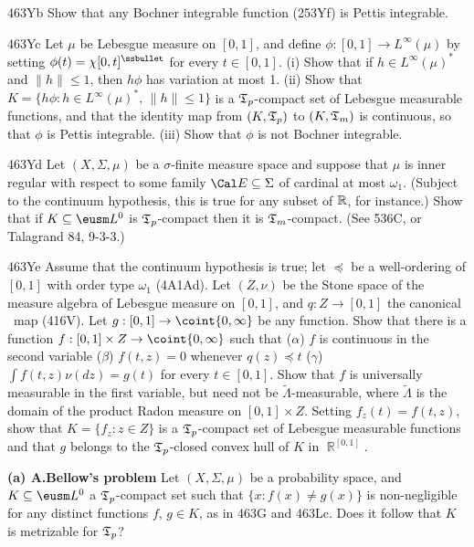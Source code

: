 {\spheader 463Yb Show that any Bochner integrable function (253Yf) is
Pettis integrable.

\spheader 463Yc Let $\mu$ be Lebesgue measure on $[0,1]$, and define
$\phi:[0,1]\to L^{\infty}(\mu)$ by setting
$\phi(t)=\chi[0,t]^{\ssbullet}$ for every $t\in[0,1]$.   (i) Show that
if $h\in L^{\infty}(\mu)^*$ and $\|h\|\le 1$, then $h\phi$ has variation
at most 1.  (ii) Show that $K=\{h\phi:h\in L^{\infty}(\mu)^*,\,\|h\|\le
1\}$ is a $\frak T_p$-compact set of Lebesgue measurable functions, and
that the identity map from $(K,\frak T_p)$ to $(K,\frak T_m)$ is
continuous, so that $\phi$ is Pettis integrable.   (iii) Show that
$\phi$ is not Bochner integrable.

\spheader 463Yd Let $(X,\Sigma,\mu)$ be a $\sigma$-finite measure space
and suppose that $\mu$ is inner regular with respect to some family
$\Cal E\subseteq\Sigma$ of cardinal at most $\omega_1$.   (Subject to
the continuum hypothesis, this is true for any subset of $\Bbb R$, for
instance.)   Show that if $K\subseteq\eusm L^0$ is
$\frak T_p$-compact then it is $\frak T_m$-compact.   (See
536C\Latereditions, or {\smc Talagrand 84}, 9-3-3.)

\spheader 463Ye Assume that the continuum hypothesis is true;  let
$\preccurlyeq$ be a well-ordering of $[0,1]$ with order type $\omega_1$
(4A1Ad).   Let $(Z,\nu)$ be the Stone space of the measure algebra of
Lebesgue measure on $[0,1]$, and $q:Z\to[0,1]$ the canonical \imp\ map
(416V). Let $g:[0,1]\to\coint{0,\infty}$ be any function.   Show that
there is a
function $f:[0,1]\times Z\to\coint{0,\infty}$ such that ($\alpha$) $f$
is continuous in the second variable ($\beta$) $f(t,z)=0$ whenever
$q(z)\preccurlyeq t$ ($\gamma$) $\int f(t,z)\nu(dz)=g(t)$ for every
$t\in[0,1]$.   Show that $f$ is universally measurable in the first
variable, but need not be $\tilde\Lambda$-measurable, where $\tilde\Lambda$
is the domain of the product Radon measure on
$[0,1]\times Z$.   Setting $f_z(t)=f(t,z)$, show that $K=\{f_z:z\in Z\}$
is a $\frak T_p$-compact set of Lebesgue measurable functions and that
$g$ belongs to the $\frak T_p$-closed convex hull of $K$ in
$\BbbR^{[0,1]}$.
}%

 {\bf (a) A.Bellow's problem}
Let $(X,\Sigma,\mu)$ be a probability space, and
$K\subseteq\eusm L^0$ a $\frak T_p$-compact set such that
$\{x:f(x)\ne g(x)\}$ is
non-negligible for any distinct functions $f$, $g\in K$, as in 463G and
463Lc.   Does it follow that $K$ is metrizable for $\frak T_p$?

